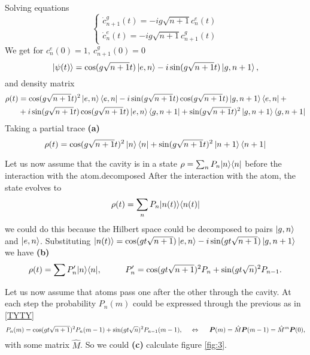 Solving equations
\begin{equation*}
  \begin{cases}
    \dot{c}_{n+1}^g(t) =  -i g \sqrt{n+1}  c_{n}^e(t)\\
    \dot{c}_{n}^e(t) = -i g \sqrt{n+1}  c_{n+1}^g(t)
  \end{cases}
\end{equation*}
We get for $c_{n}^e(0) = 1,\ c_{n+1}^g(0) = 0$
\begin{equation*}
 \left| \psi(t) \right\rangle =  \cos(g\sqrt{n+1}  t) \left| e,n \right\rangle - i \sin(g\sqrt{n+1}  t) \left| g, n+1 \right\rangle,
\end{equation*}
and density matrix
\begin{align*}
  \rho(t)&= \cos(g\sqrt{n+1}  t)^2 \left| e, n \right\rangle \left\langle e, n \right|     - i \sin(g\sqrt{n+1}  t)  \cos(g\sqrt{n+1}  t) \left| g, n+1 \right\rangle \left\langle e, n \right| + \\
  &+ i \sin(g\sqrt{n+1}  t)  \cos(g\sqrt{n+1}  t) \left| e, n \right\rangle \left\langle g, n+1 \right|   + \sin(g\sqrt{n+1}  t)^2 \left| g, n+1 \right\rangle \left\langle g, n+1 \right|
  \end{align*}
Taking a partial trace \textbf{(a)}
\begin{equation*}
  \rho(t) = \cos(g\sqrt{n+1}  t)^2 \left| n \right\rangle \left\langle n \right|  + \sin(g\sqrt{n+1}  t)^2 \left| n+1 \right\rangle \left\langle n+1 \right|
\end{equation*}

Let us now assume that the cavity is in a state $\rho = \sum_n P_n \kb{n}{n}$  before the interaction with the atom.decomposed
After the interaction with the atom, the state evolves to
\begin{equation*}
    \rho(t) = \sum_n P_n \kb{n(t)}{n(t)}
\end{equation*}
we could do this because the Hilbert space could be decomposed to pairs  $\left| g, n \right\rangle$ and $\left| e, n \right\rangle$. Substituting $\left| n(t) \right\rangle = \cos(gt \sqrt{n+1}) \left| e,n \right\rangle - i \sin (gt \sqrt{n+1}) \left| g,n+1 \right\rangle$ we have \textbf{(b)}
\begin{equation}
    \rho(t) = \sum P_n' \kb{n}{n},
    \hspace{10 mm} 
    P_n' = \cos(gt \sqrt{n+1})^2 P_n + \sin(gt \sqrt{n})^2 P_{n-1}.
    \label{TYTY}
\end{equation}

Let us now assume that atoms pass one after the other through the cavity. At each step the probability $P_n(m)$ could be expressed through the previous as in \eqref{TYTY}
\begin{equation*}
    P_n(m) = \cos(gt \sqrt{n+1})^2 P_n(m-1) + \sin(gt \sqrt{n})^2 P_{n-1}(m-1),
    \hspace{0.5cm} \Leftrightarrow \hspace{0.5cm}    
    \boldsymbol{P}(m) = \hat{M} \boldsymbol{P}(m-1) = \hat{M}^m \boldsymbol{P}(0),
\end{equation*}
with some matrix $\hat{M}$. So we could \textbf{(c)} calculate figure \ref{fig:3}.

